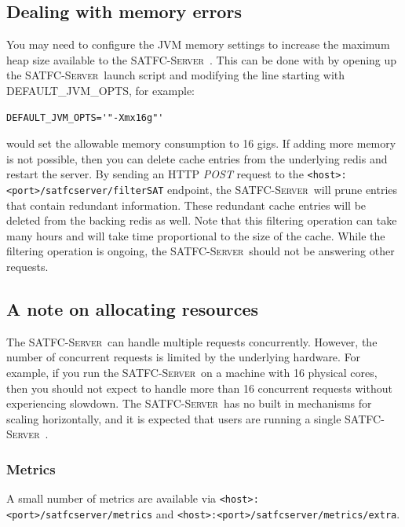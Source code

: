 \documentclass[
10pt, %
letterpaper, %
oneside, %
headinclude,footinclude, %
BCOR5mm, %
needspace, %
]{scrartcl}
\newcommand{\SATFCServer}{\textsc{SATFC-Server}~}
\begin{document}
\subsection{Dealing with memory errors}
You may need to configure the JVM memory settings to increase the maximum heap size available to the \SATFCServer. This can be done with by opening up the \SATFCServer launch script and modifying the line starting with DEFAULT\_JVM\_OPTS, for example:
\begin{lstlisting}[style=Bash]
DEFAULT_JVM_OPTS='"-Xmx16g"'
\end{lstlisting}
would set the allowable memory consumption to 16 gigs. If adding more memory is not possible, then you can delete cache entries from the underlying redis and restart the server. By sending an HTTP \emph{POST} request to the \texttt{<host>:<port>/satfcserver/filterSAT} endpoint, the \SATFCServer will prune entries that contain redundant information. These redundant cache entries will be deleted from the backing redis as well. Note that this filtering operation can take many hours and will take time proportional to the size of the cache. While the filtering operation is ongoing, the \SATFCServer should not be answering other requests.

\subsection{A note on allocating resources}
The \SATFCServer can handle multiple requests concurrently. However, the number of concurrent requests is limited by the underlying hardware. For example, if you run the \SATFCServer on a machine with 16 physical cores, then you should not expect to handle more than 16 concurrent requests without experiencing slowdown. The \SATFCServer has no built in mechanisms for scaling horizontally, and it is expected that users are running a single \SATFCServer.

\subsubsection{Metrics}
A small number of metrics are available via \texttt{<host>:<port>/satfcserver/metrics} and \texttt{<host>:<port>/satfcserver/metrics/extra}.
\end{document}
